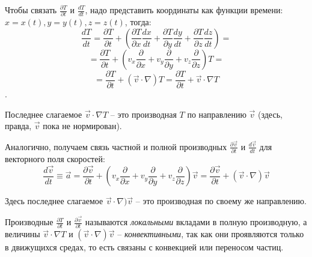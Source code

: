 	Чтобы связать \( \frac{\partial T}{\partial t} \) и \( \frac{dT}{dt} \), надо представить координаты как функции времени: \( x = x(t), y = y(t), z = z(t) \), тогда:
	\[ \frac{dT}{dt} = \frac{\partial T}{\partial t} + (\frac{\partial T}{\partial x}\frac{dx}{dt} + \frac{\partial T}{\partial y}\frac{dy}{dt} + \frac{\partial T}{\partial z}\frac{dz}{dt}) = \]
	\[ = \frac{\partial T}{\partial t} + (v_x\frac{\partial}{\partial x} + v_y\frac{\partial}{\partial y} + v_z\frac{\partial}{\partial z})T = \]
	\[ = \frac{\partial T}{\partial t} + (\vec{v}\cdot\nabla)T = \frac{\partial T}{\partial t} + \vec{v}\cdot\nabla T \].
	
	Последнее слагаемое \( \vec{v}\cdot\nabla T \) -- это производная \( T \) по направлению \( \vec{v} \) (здесь, правда, \( \vec{v} \) пока не нормирован).
	
	Аналогично, получаем связь частной и полной производных \( \frac{\partial\vec{v}}{\partial t} \) и \( \frac{d\vec{v}}{dt} \) для векторного поля скоростей:
	\[ \frac{d\vec{v}}{dt} \equiv \vec{a} = \frac{\partial\vec{v}}{\partial t} + (v_x\frac{\partial}{\partial x} + v_y\frac{\partial}{\partial y} + v_z\frac{\partial}{\partial z})\vec{v} = \frac{\partial\vec{v}}{\partial t} + (\vec{v}\cdot\nabla)\vec{v} \]
	
	Здесь последнее слагаемое \( \vec{v}\cdot\nabla)\vec{v} \) -- это производная по своему же направлению.
	
	\begin{remark}
	Производные \( \frac{\partial T}{\partial t} \) и \( \frac{\partial\vec{v}}{\partial t} \) называются \textit{локальными} вкладами в полную производную, а величины \( \vec{v}\cdot\nabla T \) и \( (\vec{v}\cdot\nabla)\vec{v} \) -- \textit{конвективными}, так как они проявляются только в движущихся средах, то есть связаны с конвекцией или переносом частиц.
	\end{remark}

